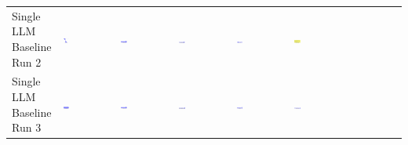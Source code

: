 \begin{table}
\begin{tabular}{@{}mmmmmm@{}}
    \makecell{Single LLM \\ Baseline \\ Run 2} & \includegraphics[width=0.13\textwidth]{./run_2/png/gpt-4o_results/Arrow.png} & \includegraphics[width=0.13\textwidth]{./run_2/png/o1-preview_results/Arrow.png} & \includegraphics[width=0.13\textwidth]{./run_2/png/claude-3-5-sonnet-20240620_results/Arrow.png} & \includegraphics[width=0.13\textwidth]{./run_2/png/watsonx_meta-llama_llama-3-1-70b-instruct_results/Arrow.png} & \includegraphics[width=0.13\textwidth]{./run_2/png/watsonx_meta-llama_llama-3-405b-instruct_results/Arrow.png} \\
    \makecell{Single LLM \\ Baseline \\ Run 3} & \includegraphics[width=0.13\textwidth]{./run_3/png/gpt-4o_results/Arrow.png} & \includegraphics[width=0.13\textwidth]{./run_3/png/o1-preview_results/Arrow.png} & \includegraphics[width=0.13\textwidth]{./run_3/png/claude-3-5-sonnet-20240620_results/Arrow.png} & \includegraphics[width=0.13\textwidth]{./run_3/png/watsonx_meta-llama_llama-3-1-70b-instruct_results/Arrow.png} & \includegraphics[width=0.13\textwidth]{./run_3/png/watsonx_meta-llama_llama-3-405b-instruct_results/Arrow.png} \\

\end{tabular}
\end{table}
